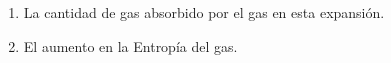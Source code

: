\documentclass[a4paper,11pt]{extarticle} %
\begin{document}
\begin{enumerate}[label=\textbf{\arabic*}), leftmargin=*]
{                \begin{enumerate}[label=\textbf{\alph* )}]
                    \item La cantidad de gas absorbido por el gas en esta expansión.
                    \item El aumento en la Entropía del gas.
                \end{enumerate}
          }

    

    \vspace{\baselineskip}

\end{enumerate}

\end{document}
